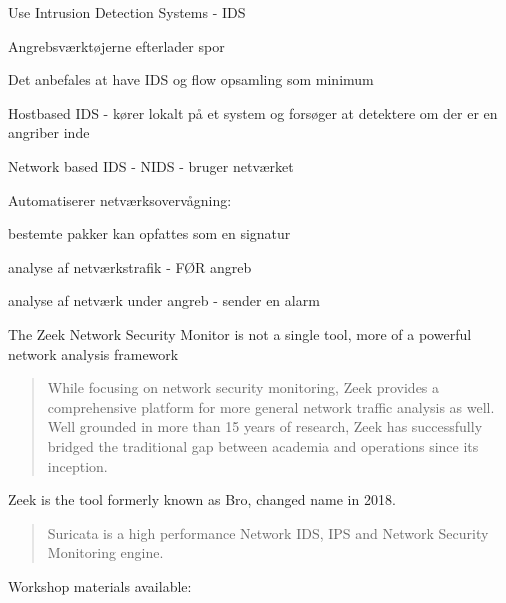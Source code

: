\documentclass[Screen16to9,17pt]{foils}
\begin{document}
\begin{list1}
\item Use Intrusion Detection Systems - IDS
\item Angrebsværktøjerne efterlader spor
\item Det anbefales at have IDS og flow opsamling som minimum
\item Hostbased IDS - kører lokalt på et system og forsøger at
  detektere om der er en angriber inde
\item Network based IDS - NIDS - bruger netværket
\item Automatiserer netværksovervågning:
  \begin{list2}
  \item bestemte pakker kan opfattes som en signatur
\item analyse af netværkstrafik - FØR angreb
\item analyse af netværk under angreb - sender en alarm
  \end{list2}
\end{list1}



The Zeek Network Security Monitor is not a single tool, more of a
powerful network analysis framework


\begin{quote}
While focusing on network security monitoring, Zeek provides a comprehensive platform for more general network traffic analysis as well. Well grounded in more than 15 years of research, Zeek has successfully bridged the traditional gap between academia and operations since its inception.
\end{quote}

Zeek is the tool formerly known as Bro, changed name in 2018. 




\begin{quote}
Suricata is a high performance Network IDS, IPS and Network Security Monitoring engine.
\end{quote}


Workshop materials available:\\
{\small{}}
\end{document}
